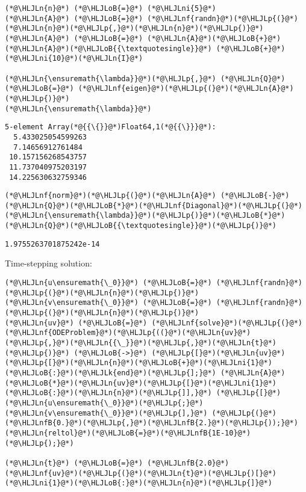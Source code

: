 \documentclass[12pt,a4paper]{article}
\newcommand{\HLJLk}[1]{\textcolor[RGB]{148,91,176}{\textbf{#1}}}
\newcommand{\HLJLn}[1]{#1}
\newcommand{\HLJLnf}[1]{\textcolor[RGB]{66,102,213}{#1}}
\newcommand{\HLJLnfB}[1]{\textcolor[RGB]{59,151,46}{#1}}
\newcommand{\HLJLni}[1]{\textcolor[RGB]{59,151,46}{#1}}
\newcommand{\HLJLoB}[1]{\textcolor[RGB]{102,102,102}{\textbf{#1}}}
\newcommand{\HLJLp}[1]{#1}
\begin{document}
\begin{lstlisting}
(*@\HLJLn{n}@*) (*@\HLJLoB{=}@*) (*@\HLJLni{5}@*)
(*@\HLJLn{A}@*) (*@\HLJLoB{=}@*) (*@\HLJLnf{randn}@*)(*@\HLJLp{(}@*)(*@\HLJLn{n}@*)(*@\HLJLp{,}@*)(*@\HLJLn{n}@*)(*@\HLJLp{)}@*)
(*@\HLJLn{A}@*) (*@\HLJLoB{=}@*) (*@\HLJLn{A}@*)(*@\HLJLoB{+}@*) (*@\HLJLn{A}@*)(*@\HLJLoB{{\textquotesingle}}@*) (*@\HLJLoB{+}@*) (*@\HLJLni{10}@*)(*@\HLJLn{I}@*)

(*@\HLJLn{\ensuremath{\lambda}}@*)(*@\HLJLp{,}@*) (*@\HLJLn{Q}@*) (*@\HLJLoB{=}@*) (*@\HLJLnf{eigen}@*)(*@\HLJLp{(}@*)(*@\HLJLn{A}@*)(*@\HLJLp{)}@*)
(*@\HLJLn{\ensuremath{\lambda}}@*)
\end{lstlisting}

\begin{lstlisting}
5-element Array(*@{{\{}}@*)Float64,1(*@{{\}}}@*):
  5.433025054599263
  7.14656912761484
 10.157156268543757
 11.737040975203197
 14.225630632759346
\end{lstlisting}


\begin{lstlisting}
(*@\HLJLnf{norm}@*)(*@\HLJLp{(}@*)(*@\HLJLn{A}@*) (*@\HLJLoB{-}@*) (*@\HLJLn{Q}@*)(*@\HLJLoB{*}@*)(*@\HLJLnf{Diagonal}@*)(*@\HLJLp{(}@*)(*@\HLJLn{\ensuremath{\lambda}}@*)(*@\HLJLp{)}@*)(*@\HLJLoB{*}@*)(*@\HLJLn{Q}@*)(*@\HLJLoB{{\textquotesingle}}@*)(*@\HLJLp{)}@*)
\end{lstlisting}

\begin{lstlisting}
1.9755263701875242e-14
\end{lstlisting}


Time-stepping solution:


\begin{lstlisting}
(*@\HLJLn{u\ensuremath{\_0}}@*) (*@\HLJLoB{=}@*) (*@\HLJLnf{randn}@*)(*@\HLJLp{(}@*)(*@\HLJLn{n}@*)(*@\HLJLp{)}@*)
(*@\HLJLn{v\ensuremath{\_0}}@*) (*@\HLJLoB{=}@*) (*@\HLJLnf{randn}@*)(*@\HLJLp{(}@*)(*@\HLJLn{n}@*)(*@\HLJLp{)}@*)
(*@\HLJLn{uv}@*) (*@\HLJLoB{=}@*) (*@\HLJLnf{solve}@*)(*@\HLJLp{(}@*)(*@\HLJLnf{ODEProblem}@*)(*@\HLJLp{((}@*)(*@\HLJLn{uv}@*)(*@\HLJLp{,}@*)(*@\HLJLn{{\_}}@*)(*@\HLJLp{,}@*)(*@\HLJLn{t}@*)(*@\HLJLp{)}@*) (*@\HLJLoB{->}@*) (*@\HLJLp{[}@*)(*@\HLJLn{uv}@*)(*@\HLJLp{[}@*)(*@\HLJLn{n}@*)(*@\HLJLoB{+}@*)(*@\HLJLni{1}@*)(*@\HLJLoB{:}@*)(*@\HLJLk{end}@*)(*@\HLJLp{];}@*) (*@\HLJLn{A}@*)(*@\HLJLoB{*}@*)(*@\HLJLn{uv}@*)(*@\HLJLp{[}@*)(*@\HLJLni{1}@*)(*@\HLJLoB{:}@*)(*@\HLJLn{n}@*)(*@\HLJLp{]],}@*) (*@\HLJLp{[}@*)(*@\HLJLn{u\ensuremath{\_0}}@*)(*@\HLJLp{;}@*) (*@\HLJLn{v\ensuremath{\_0}}@*)(*@\HLJLp{],}@*) (*@\HLJLp{(}@*)(*@\HLJLnfB{0.}@*)(*@\HLJLp{,}@*)(*@\HLJLnfB{2.}@*)(*@\HLJLp{));}@*) (*@\HLJLn{reltol}@*)(*@\HLJLoB{=}@*)(*@\HLJLnfB{1E-10}@*)(*@\HLJLp{);}@*)

(*@\HLJLn{t}@*) (*@\HLJLoB{=}@*) (*@\HLJLnfB{2.0}@*)
(*@\HLJLnf{uv}@*)(*@\HLJLp{(}@*)(*@\HLJLn{t}@*)(*@\HLJLp{)[}@*)(*@\HLJLni{1}@*)(*@\HLJLoB{:}@*)(*@\HLJLn{n}@*)(*@\HLJLp{]}@*)
\end{lstlisting}
\end{document}
